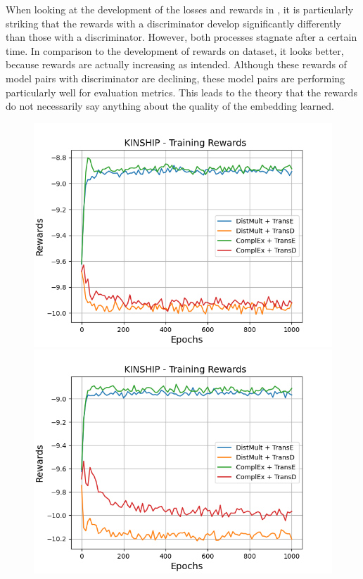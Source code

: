 When looking at the development of the losses and rewards in , it is particularly striking that the rewards with a \transe discriminator develop significantly differently than those with a \transd discriminator.
However, both processes stagnate after a certain time.
In comparison to the development of rewards on \umls dataset, it looks better, because rewards are actually increasing as intended.
Although these rewards of model pairs with \transd discriminator are declining, these model pairs are performing particularly well for evaluation metrics.
This leads to the theory that the rewards do not necessarily say anything about the quality of the embedding learned.
\clearpage
\begin{figure}[H]
    \centering
    \begin{minipage}{.5\textwidth}
      \centering
      \includegraphics[width=0.9\linewidth]{figures/results/gan_train/not_pretrained/uncertainty/max_distribution/entropy/kinship/1k_epochs/uncertainty_kinship_rew.png}
    \end{minipage}%
    \begin{minipage}{.5\textwidth}
      \centering
      \includegraphics[width=0.9\linewidth]{figures/results/gan_train/not_pretrained/uncertainty/max_distribution/least_confidence/kinship/uncertainty_kinship_rew.png}

\end{minipage}
\end{figure}
